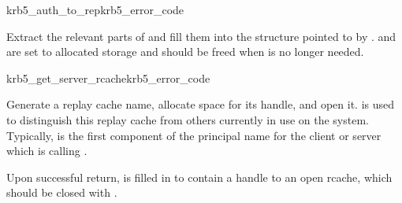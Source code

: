 \begin{funcdecl}{krb5_auth_to_rep}{krb5_error_code}{\funcin}
\funcout
{}
\end{funcdecl}
Extract the relevant parts of  and fill them into the
structure pointed to by .  
and  are set to allocated storage and
should be freed when  is no longer needed.

\begin{funcdecl}{krb5_get_server_rcache}{krb5_error_code}{\funcin}
\funcout
{}
\end{funcdecl}
Generate a replay cache name, allocate space for its handle, and open
it.   is used to distinguish this replay cache from
others currently in use on the system.  Typically, 
is the first component of the principal name for the client or server
which is calling .

Upon successful return,  is filled in to contain a
handle to an open rcache, which should be closed with
.


